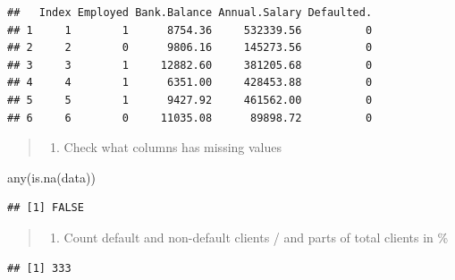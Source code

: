 \documentclass[
]{book}
\newenvironment{Shaded}{\begin{snugshade}}{\end{snugshade}}
\newcommand{\DecValTok}[1]{\textcolor[rgb]{0.00,0.00,0.81}{#1}}
\newcommand{\FunctionTok}[1]{\textcolor[rgb]{0.00,0.00,0.00}{#1}}
\newcommand{\NormalTok}[1]{#1}
\newcommand{\OtherTok}[1]{\textcolor[rgb]{0.56,0.35,0.01}{#1}}
\newcommand{\SpecialCharTok}[1]{\textcolor[rgb]{0.00,0.00,0.00}{#1}}
\providecommand{\tightlist}{%
  \setlength{\itemsep}{0pt}\setlength{\parskip}{0pt}}
\begin{document}
\begin{verbatim}
##   Index Employed Bank.Balance Annual.Salary Defaulted.
## 1     1        1      8754.36     532339.56          0
## 2     2        0      9806.16     145273.56          0
## 3     3        1     12882.60     381205.68          0
## 4     4        1      6351.00     428453.88          0
## 5     5        1      9427.92     461562.00          0
## 6     6        0     11035.08      89898.72          0
\end{verbatim}

\begin{quote}
\begin{enumerate}
\def\labelenumi{\arabic{enumi}.}
\tightlist
\item
  Check what columns has missing values
\end{enumerate}
\end{quote}

\begin{Shaded}
\begin{Highlighting}[]
\FunctionTok{any}\NormalTok{(}\FunctionTok{is.na}\NormalTok{(data))}
\end{Highlighting}
\end{Shaded}

\begin{verbatim}
## [1] FALSE
\end{verbatim}

\begin{quote}
\begin{enumerate}
\def\labelenumi{\arabic{enumi}.}
\setcounter{enumi}{1}
\tightlist
\item
  Count default and non-default clients / and parts of total clients in \%
\end{enumerate}
\end{quote}

\begin{Shaded}
\end{Shaded}

\begin{verbatim}
## [1] 333
\end{verbatim}
\end{document}
